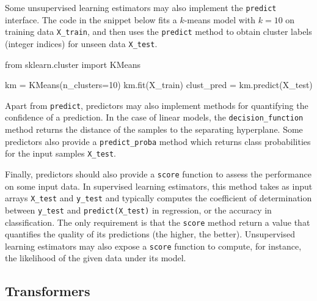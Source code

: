 \documentclass{llncs}
\begin{document}
Some unsupervised learning estimators may also implement the \texttt{predict}
interface. The code in the snippet below fits a $k$-means model with $k=10$ on
training data \texttt{X\_train}, and then uses the  \texttt{predict} method to
obtain cluster labels (integer indices) for unseen data \texttt{X\_test}.
\begin{pythoncode}
from sklearn.cluster import KMeans

km = KMeans(n_clusters=10)
km.fit(X_train)
clust_pred = km.predict(X_test)
\end{pythoncode}

Apart from \texttt{predict}, predictors may also implement methods
for quantifying the confidence of a prediction. In the case of
linear models, the \texttt{decision\_function} method returns
the distance of the samples to the separating hyperplane. Some
predictors also provide a \texttt{predict\_proba} method which returns
class probabilities for the input samples \texttt{X\_test}.

Finally, predictors should also provide a \texttt{score} function to assess the
performance on some input data. In supervised learning estimators, this method
takes as input arrays \texttt{X\_test} and \texttt{y\_test} and typically
computes the coefficient of determination between \texttt{y\_test} and
\texttt{predict(X\_test)} in regression, or the accuracy
in classification.
The only requirement is that the \texttt{score} method return a value
that quantifies the quality of its predictions (the higher, the better).
Unsupervised learning estimators may also expose a \texttt{score} function
to compute, for instance, the likelihood of the given data under its model.

\subsection{Transformers}
\end{document}
